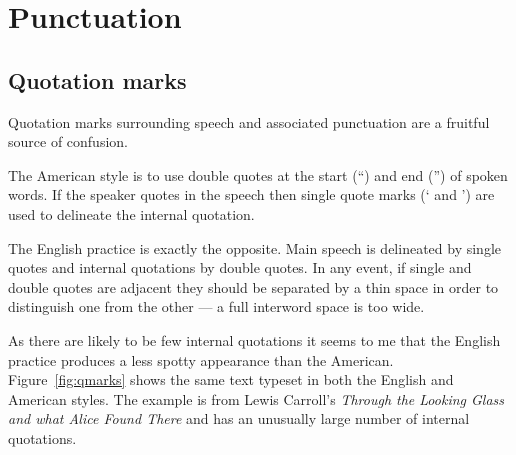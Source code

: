 \documentclass[10pt,a4paper,oneside,extrafontsizes]{memoir}%
\begin{document}

\section{Punctuation}

\subsection{Quotation marks}


\begin{paracol}{2}
\switchEng
    Quotation marks surrounding speech and associated punctuation 
are a fruitful source of confusion.

    The American style is to use double quotes at the start (``) and 
end ('') of spoken words. If the speaker quotes in the speech then single
quote marks (` and ') are used to delineate the internal quotation.

    The English practice is exactly the opposite. Main speech is delineated
by single quotes and internal quotations by double quotes. 
In any event,
if single and double quotes are adjacent they should be separated by a thin
space in order to distinguish one from the other --- 
a full interword space is too wide.

    As there are likely to be few internal quotations 
it seems to me that
the English practice produces a less spotty appearance than the American.
Figure~\ref{fig:qmarks} shows the same text typeset in both the English
and American styles. The example is from Lewis Carroll's 
\emph{Through the Looking Glass and what Alice Found There} 
and has an unusually large number of internal quotations. 
\end{paracol}
\end{document}
